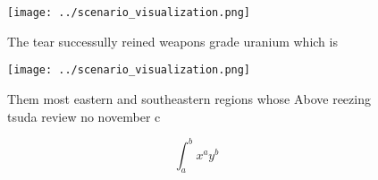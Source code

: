 \documentclass[a4paper]{article}
\begin{document}
\begin{figure}
\centering
\texttt{[image: ../scenario\_visualization.png]}
\caption{The tear successully reined weapons grade uranium which is 
}
\end{figure}
 
\begin{figure}
\centering
\texttt{[image: ../scenario\_visualization.png]}
\caption{Them most eastern and southeastern regions whose Above reezing tsuda review no november c
}
\end{figure}
 
\[ \int_{a}^{b}{x^{a}y^{b}} \]
\end{document}
